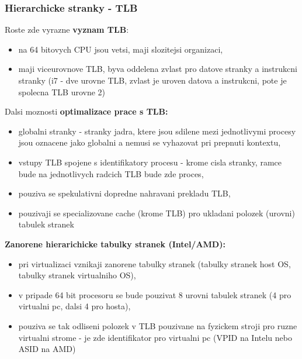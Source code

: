 \documentclass[a4paper, 11pt]{article}
\begin{document}
\newpage

\subsubsection{Hierarchicke stranky - TLB}
Roste zde vyrazne \textbf{vyznam TLB}:
\begin{itemize}
    \item na 64 bitovych CPU jsou vetsi, maji slozitejsi organizaci,
    \item maji viceurovnove TLB, byva oddelena zvlast pro datove stranky a instrukcni stranky (i7 - dve urovne TLB, zvlast je uroven datova a instrukcni, pote je spolecna TLB urovne 2) \\
\end{itemize}

Dalsi moznosti \textbf{optimalizace prace s TLB:}
\begin{itemize}
    \item globalni stranky - stranky jadra, ktere jsou sdilene mezi jednotlivymi procesy jsou oznacene jako globalni a nemusi se vyhazovat pri prepnuti kontextu,
    \item vstupy TLB spojene s identifikatory procesu - krome cisla stranky, ramce bude na jednotlivych radcich TLB bude zde proces,
    \item pouziva se spekulativni dopredne nahravani prekladu TLB,
    \item pouzivaji se specializovane cache (krome TLB) pro ukladani polozek (urovni) tabulek stranek \\
\end{itemize}

\textbf{Zanorene hierarichicke tabulky stranek (Intel/AMD):}
\begin{itemize}
    \item pri virtualizaci vznikaji zanorene tabulky stranek (tabulky stranek host OS, tabulky stranek virtualniho OS),
    \item v pripade 64 bit procesoru se bude pouzivat 8 urovni tabulek stranek (4 pro virtualni pc, dalsi 4 pro hosta),
    \item pouziva se tak odliseni polozek v TLB pouzivane na fyzickem stroji pro ruzne virtualni strome - je zde identifikator pro virtualni pc (VPID na Intelu nebo ASID na AMD) \\
\end{itemize}
\end{document}
